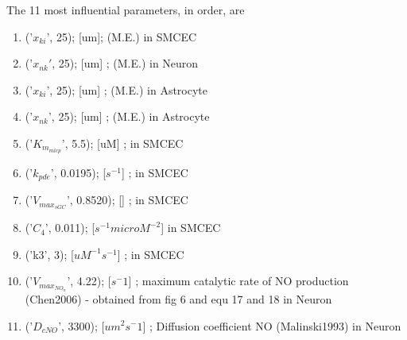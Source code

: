 \documentclass{article}
\begin{document}
The 11 most influential parameters, in order, are
\begin{enumerate}\label{ranked_list_NO_parameters}
\item ('$x_{ki}$', 25);  [um];  (M.E.) in SMCEC
\item ('$x_{nk}'$, 25);             [um] ;  (M.E.) in Neuron
\item ('$x_{ki}$', 25);             [um] ;  (M.E.) in Astrocyte
\item ('$x_{nk}$', 25);             [um] ;  (M.E.) in Astrocyte
\item  ('$K_{m_{mlcp}}$', 5.5);  [uM] ; in SMCEC
\item ('$k_{pde}$', 0.0195);  [$s^{-1}$] ; in SMCEC
\item  ('$V_{max_{sGC}}$', 0.8520);  [] ; in SMCEC
\item ('$C_4$', 0.011);  [$s^{-1} microM^{-2}$]  in SMCEC
\item ('k3', 3);  [$uM^{-1} s^{-1}$] ; in SMCEC
\item ('$V_{max_{NO_{n}}}$', 4.22);     [$s^-1$] ; maximum catalytic rate of NO production (Chen2006) - obtained from fig 6 and equ 17 and 18 in Neuron
\item ('$D_{cNO}$', 3300);          [$um^2 s^-1$] ; Diffusion coefficient NO (Malinski1993) in Neuron
\end{enumerate}
\end{document}
